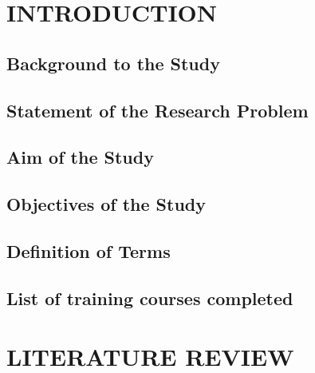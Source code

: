 \documentclass[12pt,a4paper]{report}
\begin{document}
\uonannualtitle

\begin{abstract}
  Write the abstract here: the problem, what you did this year, what you
  found, and what it means for the thesis.
\end{abstract}

\tableofcontents
\clearpage

\chapter{INTRODUCTION}

\section{Background to the Study}

\section{Statement of the Research Problem}

\section{Aim of the Study}

\section{Objectives of the Study}

\section{Definition of Terms}

\section{List of training courses completed}

\chapter{LITERATURE REVIEW}
\end{document}
